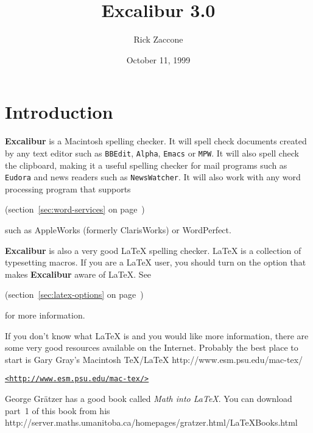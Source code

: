 \documentclass[11pt,titlepage]{article}
\newcommand{\ex}{\textbf{Excalibur}}
\begin{document}
\title{Excalibur 3.0}
\author{Rick Zaccone}
\date{October 11, 1999}
\tableofcontents
\newpage
{}
\maketitle
\sloppy

\section{Introduction}

\ex{} is a Macintosh spelling checker.  It will spell check documents
created by any text editor such as \texttt{BBEdit}, \texttt{Alpha},
\texttt{Emacs} or \texttt{MPW}.  It will also spell check the
clipboard, making it a useful spelling checker for mail programs such
as \texttt{Eudora} and news readers such as \texttt{NewsWatcher}.  It
will also work with any word processing program that supports
\begin{latexonly}
  (section~\ref{sec:word-services} on
  page~\pageref{sec:word-services})
\end{latexonly}
such as AppleWorks (formerly ClarisWorks) or WordPerfect.

\ex{} is also a very good \LaTeX{} spelling checker.  \LaTeX{} is a
collection of typesetting macros.  If you are a \LaTeX{} user, you
should turn on the option that makes \ex{} aware of \LaTeX.  See
\begin{latexonly}
  (section~\ref{sec:latex-options} on
  page~\pageref{sec:latex-options})
\end{latexonly}
for more information.

If you don't know what \LaTeX{} is and you would like more
information, there are some very good resources available on the
Internet.  Probably the best place to start is Gary Gray's
Macintosh \TeX/\LaTeX{} 
{http://www.esm.psu.edu/mac-tex/}
\begin{latexonly}
\begin{alltt}
\url{<http://www.esm.psu.edu/mac-tex/>}
\end{alltt}
\end{latexonly}

George Gr\"{a}tzer has a good book called \emph{Math into \LaTeX}.
You can download part~1 of this book from his 
{http://server.maths.umanitoba.ca/homepages/gratzer.html/LaTeXBooks.html}
\end{document}

